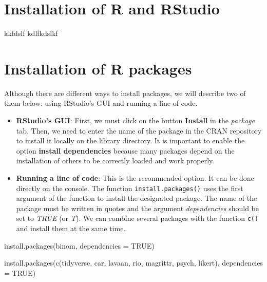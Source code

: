 \documentclass[
]{book}
\newenvironment{Shaded}{\begin{snugshade}}{\end{snugshade}}
\newcommand{\AttributeTok}[1]{\textcolor[rgb]{0.77,0.63,0.00}{#1}}
\newcommand{\ConstantTok}[1]{\textcolor[rgb]{0.00,0.00,0.00}{#1}}
\newcommand{\FunctionTok}[1]{\textcolor[rgb]{0.00,0.00,0.00}{#1}}
\newcommand{\NormalTok}[1]{#1}
\newcommand{\StringTok}[1]{\textcolor[rgb]{0.31,0.60,0.02}{#1}}
\theoremstyle{definition}
\theoremstyle{definition}
\theoremstyle{definition}
\theoremstyle{definition}
\theoremstyle{remark}
\begin{document}
\hypertarget{appenA1}{%
\section{Installation of R and RStudio}\label{appenA1}}

kkfdslf kdlfkdslkf

\newpage

\hypertarget{appenA2}{%
\section{Installation of R packages}\label{appenA2}}

Although there are different ways to install packages, we will describe two of them below: using RStudio's GUI and running a line of code.

\begin{itemize}
\item
  \textbf{RStudio's GUI}: First, we must click on the button \textbf{Install} in the \emph{package} tab. Then, we need to enter the name of the package in the CRAN repository to install it locally on the library directory. It is important to enable the option \textbf{install dependencies} because many packages depend on the installation of others to be correctly loaded and work properly.
\item
  \textbf{Running a line of code}: This is the recommended option. It can be done directly on the console. The function \texttt{install.packages()} uses the first argument of the function to install the designated package. The name of the package must be written in quotes and the argument \emph{dependencies} should be set to \emph{TRUE} (or \emph{T}). We can combine several packages with the function \texttt{c()} and install them at the same time.
\end{itemize}

\begin{Shaded}
\begin{Highlighting}[]

\FunctionTok{install.packages}\NormalTok{(}\StringTok{\textquotesingle{}binom\textquotesingle{}}\NormalTok{, }\AttributeTok{dependencies =} \ConstantTok{TRUE}\NormalTok{)}

\FunctionTok{install.packages}\NormalTok{(}\FunctionTok{c}\NormalTok{(}\StringTok{\textquotesingle{}tidyverse\textquotesingle{}}\NormalTok{, }\StringTok{\textquotesingle{}car\textquotesingle{}}\NormalTok{, }\StringTok{\textquotesingle{}lavaan\textquotesingle{}}\NormalTok{, }\StringTok{\textquotesingle{}rio\textquotesingle{}}\NormalTok{, }\StringTok{\textquotesingle{}magrittr\textquotesingle{}}\NormalTok{, }\StringTok{\textquotesingle{}psych\textquotesingle{}}\NormalTok{,}
                   \StringTok{\textquotesingle{}likert\textquotesingle{}}\NormalTok{), }\AttributeTok{dependencies =} \ConstantTok{TRUE}\NormalTok{)}
\end{Highlighting}
\end{Shaded}
\end{document}
